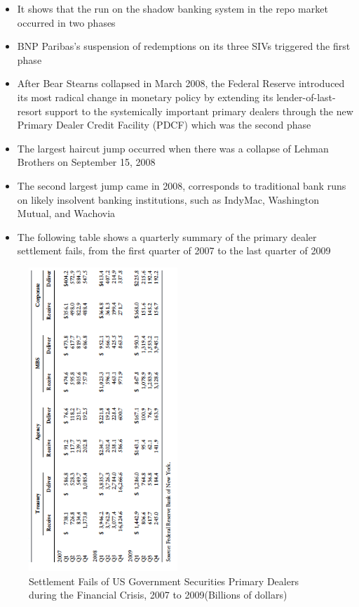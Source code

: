 \documentclass[11pt]{beamer}
\begin{document}
\begin{frame}
\begin{itemize}
\item It shows that the run on the shadow banking system in the repo market occurred in two phases
\item BNP Paribas’s suspension of redemptions on its three SIVs triggered the first phase
\item After Bear Stearns collapsed in March 2008, the Federal Reserve introduced its most radical change in monetary policy by extending its lender-of-last-resort support to the systemically important primary dealers through the new Primary Dealer Credit Facility (PDCF) which was the second phase
\end{itemize}
\end{frame}

\begin{frame}
\begin{itemize}
\item The largest haircut jump occurred when there was a collapse of Lehman Brothers on September 15, 2008
\item The second largest jump came in 2008, corresponds to traditional bank runs on likely insolvent banking institutions, such as IndyMac, Washington Mutual, and Wachovia
\item The following table shows a quarterly summary of the primary dealer settlement fails, from the first quarter of 2007 to the last quarter of 2009
\end{itemize}
\end{frame}

\begin{frame}
\begin{figure}
\includegraphics[width=0.5\textwidth,angle=270]{11_13.png}
\caption{Settlement Fails of US Government Securities Primary Dealers during the Financial Crisis, 2007 to 2009(Billions of dollars)}
\end{figure}
\end{frame}
\end{document}
